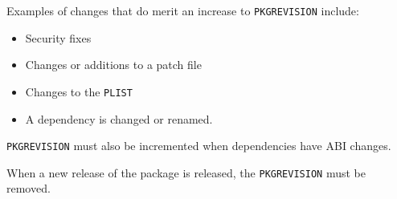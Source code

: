 Examples of changes that do merit an increase to {\tt PKGREVISION} include:
\begin{itemize}
   \item Security fixes
   \item Changes or additions to a patch file
   \item Changes to the {\tt PLIST}
   \item A dependency is changed or renamed.
\end{itemize}

{\tt PKGREVISION} must also be incremented when dependencies have ABI changes.

When a new release of the package is released, the {\tt PKGREVISION} must be
removed.
